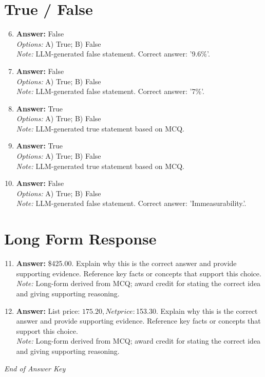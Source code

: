 \documentclass[12pt]{article}
\begin{document}
\section*{True / False}
\begin{enumerate}[label=\arabic*.]
\setcounter{enumi}{5}
\item \textbf{Answer:} False
\\ \textit{Options:} A) True; B) False
\\ \textit{Note:} LLM-generated false statement. Correct answer: '9.6\%'.
\item \textbf{Answer:} False
\\ \textit{Options:} A) True; B) False
\\ \textit{Note:} LLM-generated false statement. Correct answer: '7\%'.
\item \textbf{Answer:} True
\\ \textit{Options:} A) True; B) False
\\ \textit{Note:} LLM-generated true statement based on MCQ.
\item \textbf{Answer:} True
\\ \textit{Options:} A) True; B) False
\\ \textit{Note:} LLM-generated true statement based on MCQ.
\item \textbf{Answer:} False
\\ \textit{Options:} A) True; B) False
\\ \textit{Note:} LLM-generated false statement. Correct answer: 'Immeasurability.'.
\end{enumerate}

\section*{Long Form Response}
\begin{enumerate}[label=\arabic*.]
\setcounter{enumi}{10}
\item \textbf{Answer:} \$425.00. Explain why this is the correct answer and provide supporting evidence. Reference key facts or concepts that support this choice.
\\ \textit{Note:} Long-form derived from MCQ; award credit for stating the correct idea and giving supporting reasoning.
\item \textbf{Answer:} List price: $175.20, Net price: $153.30. Explain why this is the correct answer and provide supporting evidence. Reference key facts or concepts that support this choice.
\\ \textit{Note:} Long-form derived from MCQ; award credit for stating the correct idea and giving supporting reasoning.
\end{enumerate}

\vfill
\noindent\textit{End of Answer Key}
\end{document}
